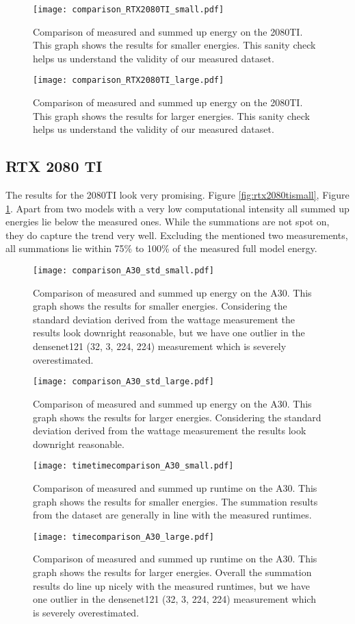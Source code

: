 \documentclass[conference]{IEEEtran}
\begin{document}
\begin{figure}
    \texttt{[image: comparison\_RTX2080TI\_small.pdf]}
    \caption{Comparison of measured and summed up energy on the 2080TI. This graph shows the results for smaller energies. This sanity check helps us understand the validity of our measured dataset.}
    \label{fig:rtx2080tismall}
    \texttt{[image: comparison\_RTX2080TI\_large.pdf]}
    \caption{Comparison of measured and summed up energy on the 2080TI. This graph shows the results for larger energies. This sanity check helps us understand the validity of our measured dataset.}
    \label{fig:rtx2080tilarge}
\end{figure}

\subsection{RTX 2080 TI}
The results for the 2080TI look very promising. Figure \ref{fig:rtx2080tismall}, Figure \ref{fig:rtx2080tilarge}. Apart from two models with a very low computational intensity all summed up energies lie below the measured ones. While the summations are not spot on, they do capture the trend very well. Excluding the mentioned two measurements, all summations lie within 75\% to 100\% of the measured full model energy.

\begin{figure}
    \texttt{[image: comparison\_A30\_std\_small.pdf]}
    \caption{Comparison of measured and summed up energy on the A30. This graph shows the results for smaller energies. Considering the standard deviation derived from the wattage measurement the results look downright reasonable, but we have one outlier in the densenet121 (32, 3, 224, 224) measurement which is severely overestimated.}
    \label{fig:a30small}
    \texttt{[image: comparison\_A30\_std\_large.pdf]}
    \caption{Comparison of measured and summed up energy on the A30. This graph shows the results for larger energies. Considering the standard deviation derived from the wattage measurement the results look downright reasonable.}
    \label{fig:a30large}
\end{figure}


\begin{figure}
    \texttt{[image: timetimecomparison\_A30\_small.pdf]}
    \caption{Comparison of measured and summed up runtime on the A30. This graph shows the results for smaller energies. The summation results from the dataset are generally in line with the measured runtimes.}
    \label{fig:a30small}
    \texttt{[image: timecomparison\_A30\_large.pdf]}
    \caption{Comparison of measured and summed up runtime on the A30. This graph shows the results for larger energies. Overall the summation results do line up nicely with the measured runtimes, but we have one outlier in the densenet121 (32, 3, 224, 224) measurement which is severely overestimated.}
    \label{fig:a30large}
\end{figure}
\end{document}
